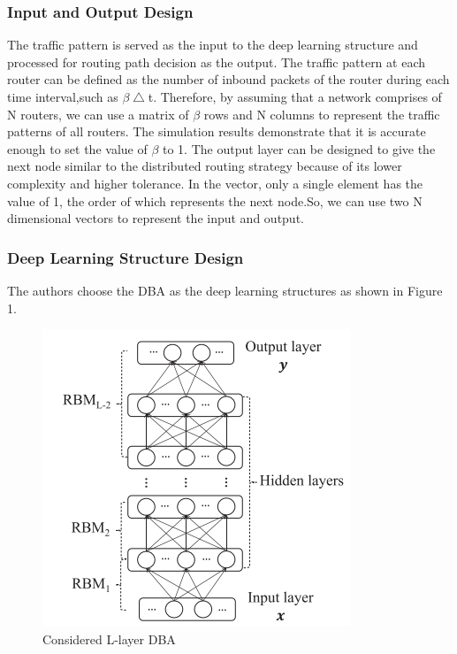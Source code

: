 \documentclass[11pt]{report}
\begin{document}
	\subsubsection{Input and Output Design}
    The traffic pattern is served as the input to the deep learning structure and processed for routing path decision as the output. The traffic pattern at each router can be defined as the number of inbound packets of the router during each time interval,such as $\beta\bigtriangleup$t. Therefore, by assuming that a network comprises of N routers, we can use a matrix of $\beta$ rows and N columns to represent the traffic patterns of all routers. The simulation results demonstrate that it is accurate enough to set the value of $\beta$ to 1. The output layer can be designed to give the next node similar to the distributed routing strategy because of its lower complexity and higher tolerance. In the vector, only a single element has the value of 1, the order of which represents the next node.So, we can use two N dimensional vectors to represent the input and output.
	
	\subsubsection{Deep Learning Structure Design}
	The authors choose the DBA as the deep learning structures as shown in Figure 1.
	\begin{figure}[h!]
		\centering
		\includegraphics[width=0.5\linewidth]{figure1.png}
		\caption{Considered L-layer DBA}
		\label{fig-label}
	\end{figure}
	
\end{document}
